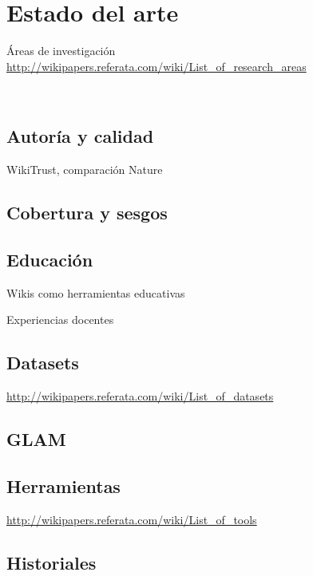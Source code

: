 \documentclass[11pt,onecolumn]{article}
\begin{document}
\section{Estado del arte}

Áreas de investigación \href{http://wikipapers.referata.com/wiki/List_of_research_areas}{http://wikipapers.referata.com/wiki/List\_of\_research\_areas}

~\citep{okoli2009}
~\citep{martin2011}
~\citep{voss2005}
~\citep{okoli2009b}
~\citep{ayers2006}
~\citep{okoli2012}
~\citep{jullien2012}
~\citep{nielsen2011}


\subsection{Autoría y calidad}

WikiTrust, comparación Nature


\subsection{Cobertura y sesgos}


\subsection{Educación}


Wikis como herramientas educativas

Experiencias docentes

\subsection{Datasets}

\href{http://wikipapers.referata.com/wiki/List_of_datasets}{http://wikipapers.referata.com/wiki/List\_of\_datasets}


\subsection{GLAM}


\subsection{Herramientas}

\href{http://wikipapers.referata.com/wiki/List_of_tools}{http://wikipapers.referata.com/wiki/List\_of\_tools}

\subsection{Historiales}
\end{document}
